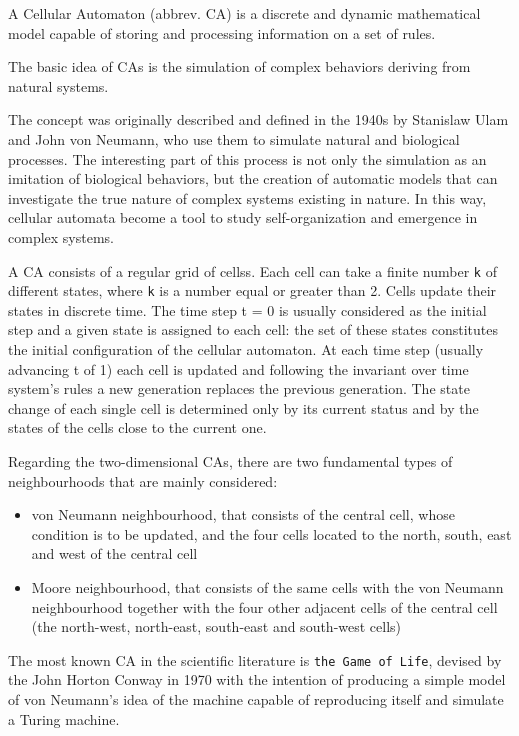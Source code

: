 A Cellular Automaton (abbrev. CA) is a discrete and dynamic mathematical model capable of storing and processing information on a set of rules.
\par
The basic idea of CAs is the simulation of complex behaviors deriving from natural systems.
\par
The concept was originally described and defined in the 1940s by Stanislaw Ulam and John von Neumann, who use them to simulate natural and biological processes. The interesting part of this process is not only the simulation as an imitation of biological behaviors, but the creation of automatic models that can investigate the true nature of complex systems existing in nature. In this way, cellular automata become a tool to study self-organization and emergence in complex systems.
\par
A CA consists of a regular grid of cellss. Each cell can take a finite number \texttt{k} of different states, where \texttt{k} is a number equal or greater than 2. Cells update their states in discrete time. The time step t = 0 is usually considered as the initial step and a given state is assigned to each cell: the set of these states constitutes the initial configuration of the cellular automaton.
At each time step (usually advancing t of 1) each cell is updated and following the invariant over time system's rules a new generation replaces the previous generation. The state change of each single cell is determined only by its current status and by the states of the cells close to the current one.
\par
Regarding the two-dimensional CAs, there are two fundamental types of neighbourhoods that are mainly considered:
\begin{itemize}
\item von Neumann neighbourhood, that consists of the central cell, whose condition is to be updated, and the four cells located to the north, south, east and west of the central cell
\item Moore neighbourhood, that consists of the same cells with the von Neumann neighbourhood together with the four other adjacent cells of the central cell (the north-west, north-east, south-east and south-west cells)
\end{itemize}
\par
The most known CA in the scientific literature is \texttt{the Game of Life}, devised by the John Horton Conway in 1970 with the intention of producing a simple model of von Neumann's idea of the machine capable of reproducing itself and simulate a Turing machine. 
